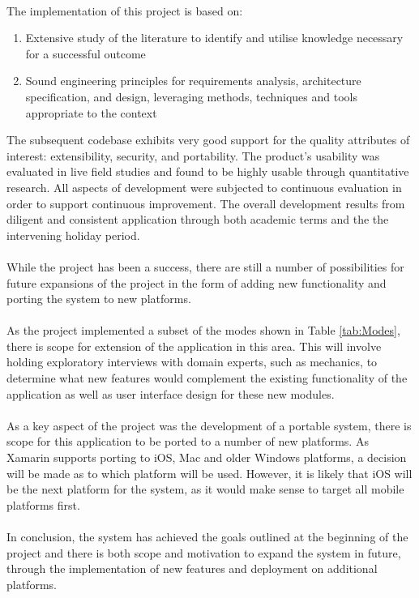 	\paragraph{}{
	The implementation of this project is based on:
	\begin{enumerate}
		\item Extensive study of the literature to identify and utilise knowledge necessary for a successful outcome
		\item Sound engineering principles for requirements analysis, architecture specification, and design, leveraging methods, techniques and tools appropriate to the context
	\end{enumerate}
	
	The subsequent codebase exhibits very good support for the quality attributes of interest: extensibility, security, and portability. The product's usability was evaluated in live field studies and found to be highly usable through quantitative research. All aspects of development were subjected to continuous evaluation in order to support continuous improvement. The overall development results from diligent and consistent application through both academic terms and the the intervening holiday period.
	}

	\paragraph{}{
	While the project has been a success, there are still a number of possibilities for future expansions of the project in the form of adding new functionality and porting the system to new platforms.
	}
			
	\paragraph{}{
	As the project implemented a subset of the modes shown in Table \ref{tab:Modes}, there is scope for extension of the application in this area. This will involve holding exploratory interviews with domain experts, such as mechanics, to determine what new features would complement the existing functionality of the application as well as user interface design for these new modules.
	}
	
	\paragraph{}{
	As a key aspect of the project was the development of a portable system, there is scope for this application to be ported to a number of new platforms. As Xamarin supports porting to iOS, Mac and older Windows platforms, a decision will be made as to which platform will be used. However, it is likely that iOS will be the next platform for the system, as it would make sense to target all mobile platforms first.
	}
	\paragraph{}{
	In conclusion, the system has achieved the goals outlined at the beginning of the project and there is both scope and motivation to expand the system in future, through the implementation of new features and deployment on additional platforms.
	}